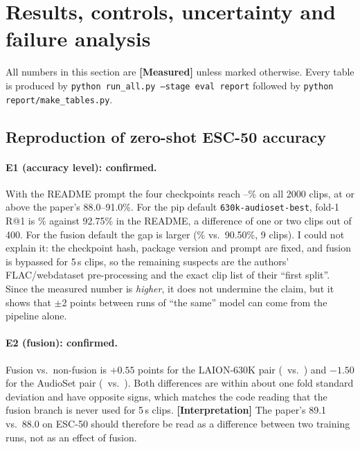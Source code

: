 \section{Results, controls, uncertainty and failure analysis}
\label{sec:results}

All numbers in this section are \textbf{[Measured]} unless marked otherwise. Every table is produced by
\texttt{python run\_all.py --stage eval report} followed by \texttt{python report/make\_tables.py}.

\subsection{Reproduction of zero-shot ESC-50 accuracy}

\begin{table}[H]
\centering\small
\caption{\textbf{[Measured]} zero-shot top-1 accuracy (\%) of the four released checkpoints with three prompts.
``Fold mean $\pm$ sd'' is over the five official folds. For comparison \textbf{[Reported]}: paper Table~4 gives 89.1 (CLAP), 88.0 (+fusion), 91.0 (+K2C);
the README gives fold-1 R@1 of 92.75 for \texttt{630k-audioset-best} and 90.50 for \texttt{630k-audioset-fusion-best} with the first prompt.}
\label{tab:repro}
\resizebox{\linewidth}{!}{}
\end{table}

\paragraph{E1 (accuracy level): confirmed.}
With the README prompt the four checkpoints reach \repaudiosetfusionA--\repaudiosetA\% on all 2000 clips, at or above the paper's 88.0--91.0\%.
For the pip default \texttt{630k-audioset-best}, fold-1 R@1 is \repfoldaudiosetA\% against 92.75\% in the README, a difference of one or two clips out of 400.
For the fusion default the gap is larger (\repfoldaudiosetfusionA\% vs.\ 90.50\%, 9 clips). I could not explain it: the checkpoint hash, package version and prompt are fixed,
and fusion is bypassed for 5\,s clips, so the remaining suspects are the authors' FLAC/webdataset pre-processing and the exact clip list of their ``first split''.
Since the measured number is \emph{higher}, it does not undermine the claim, but it shows that $\pm$2 points between runs of ``the same'' model can come from the pipeline alone.

\paragraph{E2 (fusion): confirmed.}
Fusion vs.\ non-fusion is $+0.55$ points for the LAION-630K pair (\repfusionA\ vs.\ \repbestA) and $-1.50$ for the AudioSet pair (\repaudiosetfusionA\ vs.\ \repaudiosetA).
Both differences are within about one fold standard deviation and have opposite signs, which matches the code reading that the fusion branch is never used for 5\,s clips.
\textbf{[Interpretation]} The paper's 89.1 vs.\ 88.0 on ESC-50 should therefore be read as a difference between two training runs, not as an effect of fusion.

